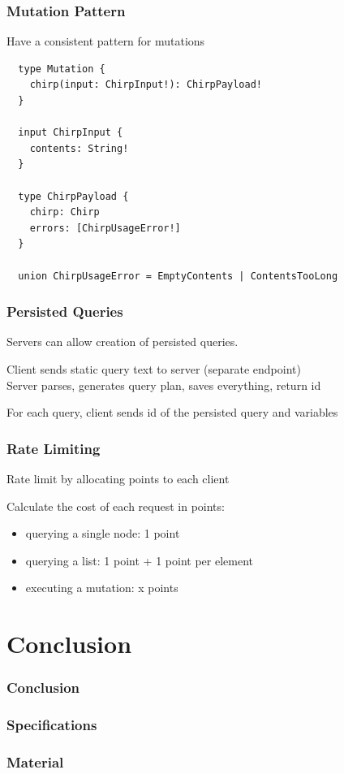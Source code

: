 \documentclass{beamer}
\begin{document}
\begin{frame}[fragile]
  \frametitle{Mutation Pattern}
  Have a consistent pattern for mutations

  \begin{verbatim}
  type Mutation {
    chirp(input: ChirpInput!): ChirpPayload!
  }

  input ChirpInput {
    contents: String!
  }

  type ChirpPayload {
    chirp: Chirp
    errors: [ChirpUsageError!]
  }

  union ChirpUsageError = EmptyContents | ContentsTooLong
  \end{verbatim}
\end{frame}


\begin{frame}
  \frametitle{Persisted Queries}
  Servers can allow creation of persisted queries.

  \vspace{1em}
  Client sends static query text to server (separate endpoint)\\
  Server parses, generates query plan, saves everything, return id

  \vspace{1em}
  For each query, client sends id of the persisted query and variables
\end{frame}


\begin{frame}
  \frametitle{Rate Limiting}
  Rate limit by allocating points to each client

  \vspace{1em}
  Calculate the cost of each request in points:
  \begin{itemize}
  \item querying a single node: 1 point
  \item querying a list: 1 point + 1 point per element
  \item executing a mutation: x points
  \end{itemize}
\end{frame}


\section{Conclusion}
\begin{frame}
  \frametitle{Conclusion}
\end{frame}

\nocite{*}
\begin{frame}
  \frametitle{Specifications}
  \printbibliography[keyword=spec]
\end{frame}

\begin{frame}
  \frametitle{Material}
  \printbibliography[keyword=material]
\end{frame}
\end{document}
